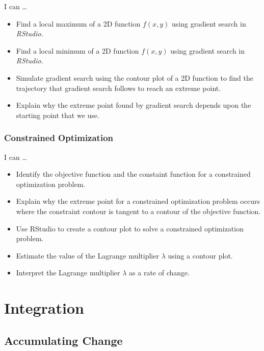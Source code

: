 \documentclass[
]{book}
\providecommand{\tightlist}{%
  \setlength{\itemsep}{0pt}\setlength{\parskip}{0pt}}
\begin{document}
I can \ldots{}

\begin{itemize}
\tightlist
\item
  Find a local maximum of a 2D function \(f(x,y)\) using gradient search in \emph{RStudio}.
\item
  Find a local minimum of a 2D function \(f(x,y)\) using gradient search in \emph{RStudio}.
\item
  Simulate gradient search using the contour plot of a 2D function to find the trajectory that gradient search follows to reach an extreme point.
\item
  Explain why the extreme point found by gradient search depends upon the starting point that we use.
\end{itemize}

\hypertarget{constrained-optimization-1}{%
\section{Constrained Optimization}\label{constrained-optimization-1}}

I can \ldots{}

\begin{itemize}
\tightlist
\item
  Identify the objective function and the constaint function for a constrained optimization problem.
\item
  Explain why the extreme point for a constrained optimization problem occurs where the constraint contour is tangent to a contour of the objective function.
\item
  Use RStudio to create a contour plot to solve a constrained optimization problem.
\item
  Estimate the value of the Lagrange multiplier \(\lambda\) using a contour plot.
\item
  Interpret the Lagrange multiplier \(\lambda\) as a rate of change.
\end{itemize}

\hypertarget{part-integration}{%
\part{Integration}\label{part-integration}}

\hypertarget{accumulating-change}{%
\chapter{Accumulating Change}\label{accumulating-change}}
\end{document}
